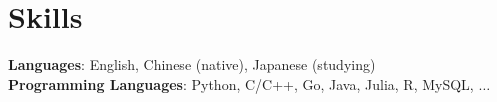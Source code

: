 \documentclass[letterpaper,11pt]{article}
\begin{document}
\section{Skills}
 \begin{itemize}[leftmargin=0.15in, label={}]
    \small{\item{
     \textbf{Languages}{: English, Chinese (native), Japanese (studying)}\\
     \textbf{Programming Languages}{: Python, C/C++, Go, Java, Julia, R, MySQL, $\ldots$} \\
    }}
 \end{itemize}


\end{document}
